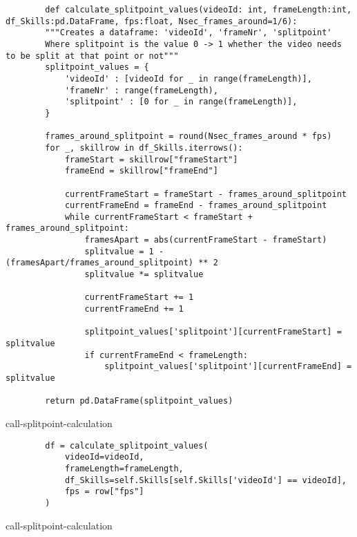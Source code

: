 \begin{listing}
    \begin{verbatim}
        def calculate_splitpoint_values(videoId: int, frameLength:int, df_Skills:pd.DataFrame, fps:float, Nsec_frames_around=1/6):
        """Creates a dataframe: 'videoId', 'frameNr', 'splitpoint'
        Where splitpoint is the value 0 -> 1 whether the video needs to be split at that point or not"""
        splitpoint_values = {
            'videoId' : [videoId for _ in range(frameLength)],
            'frameNr' : range(frameLength),
            'splitpoint' : [0 for _ in range(frameLength)],
        }

        frames_around_splitpoint = round(Nsec_frames_around * fps)
        for _, skillrow in df_Skills.iterrows():
            frameStart = skillrow["frameStart"]
            frameEnd = skillrow["frameEnd"]

            currentFrameStart = frameStart - frames_around_splitpoint
            currentFrameEnd = frameEnd - frames_around_splitpoint
            while currentFrameStart < frameStart + frames_around_splitpoint:
                framesApart = abs(currentFrameStart - frameStart)
                splitvalue = 1 - (framesApart/frames_around_splitpoint) ** 2
                splitvalue *= splitvalue

                currentFrameStart += 1
                currentFrameEnd += 1

                splitpoint_values['splitpoint'][currentFrameStart] = splitvalue
                if currentFrameEnd < frameLength:
                    splitpoint_values['splitpoint'][currentFrameEnd] = splitvalue

        return pd.DataFrame(splitpoint_values)
    \end{verbatim}
    \caption[call-splitpoint-calculation]{call-splitpoint-calculation}
    \label{code:calculate-splitpoint-values}
\end{listing}


\begin{listing}
    \begin{verbatim}
        df = calculate_splitpoint_values(
            videoId=videoId,
            frameLength=frameLength,
            df_Skills=self.Skills[self.Skills['videoId'] == videoId],
            fps = row["fps"]
        )
    \end{verbatim}
    \caption[call-splitpoint-calculation]{call-splitpoint-calculation}
    \label{code:call-splitpoint-calculation}
\end{listing}


